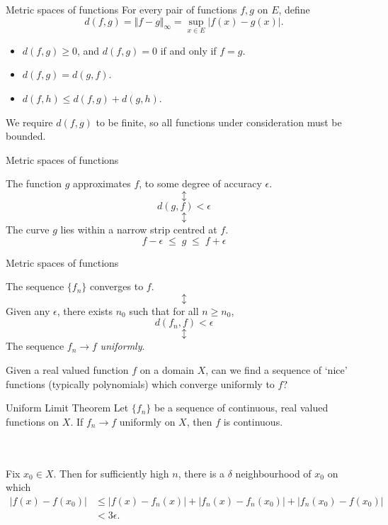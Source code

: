 \documentclass{beamer}
\begin{document}
    \begin{frame}{Metric spaces of functions}
        For every pair of functions $f, g$ on $E$, define \[
            d(f, g) = \Vert f - g\Vert_\infty = \sup_{x \in E} |f(x) - g(x)|.
        \] 

        \begin{itemize}
            \item $d(f, g) \geq 0$, and $d(f, g) = 0$ if and only if $f = g$.
            \item $d(f, g) = d(g, f)$.
            \item $d(f, h) \leq d(f, g) + d(g, h)$.
        \end{itemize}

        We require $d(f, g)$ to be finite, so all functions under consideration must be
        bounded.
    \end{frame}

    \begin{frame}{Metric spaces of functions}
    \begin{center}
    The function $g$ approximates $f$, to some degree of accuracy $\epsilon$.
    \[\updownarrow\]
    \[
        d(g, f) < \epsilon
    \]
    \[\updownarrow\]
    The curve $g$ lies within a narrow strip centred at $f$.
    \[
        f - \epsilon \;\leq\; g \;\leq\; f + \epsilon
    \] 
    \end{center}
    \end{frame}

    \begin{frame}{Metric spaces of functions}
    \begin{center}
        The sequence $\{f_n\}$ converges to $f$.
        \[\updownarrow\]
        Given any $\epsilon$, there exists $n_0$ such that for all $n \geq n_0$,
        \[
        d(f_n, f) < \epsilon
        \]
        \[\updownarrow\]
        The sequence $f_n \to f$ \emph{uniformly}.
    \end{center}
    \end{frame}

    \begin{frame}
        Given a real valued function $f$ on a domain $X$, can we find a sequence of
        `nice' functions (typically polynomials) which converge uniformly to $f$?
    \end{frame}

    \begin{frame}{Uniform Limit Theorem}
        Let $\{f_n\}$ be a sequence of continuous, real valued functions on $X$. If
        $f_n \to f$ uniformly on $X$, then $f$ is continuous.

        \\~\\

        Fix $x_0 \in X$. Then for sufficiently high $n$, there is a $\delta$
        neighbourhood of $x_0$ on which
        \begin{align*}
            |f(x) - f(x_0)|
                &\leq |f(x) - f_n(x)| + |f_n(x) - f_n(x_0)| + |f_n(x_0) - f(x_0)| \\
                &< 3\epsilon. \tag*{\qed}
        \end{align*}
    \end{frame}
\end{document}
